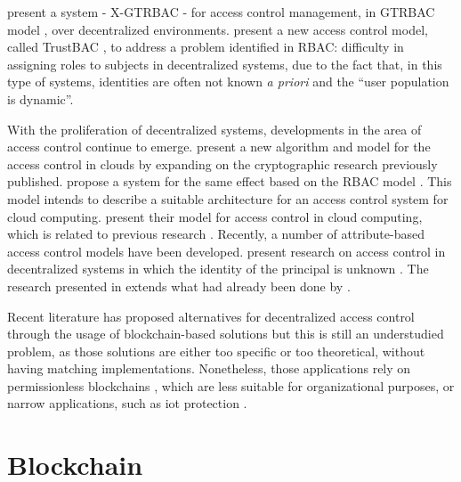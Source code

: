 \citeauthor{bhatti_x-gtrbac_2004} \cite{bhatti_x-gtrbac_2004} present a system - X-GTRBAC - for access control management, in GTRBAC model \cite{joshi_generalized_2005}, over decentralized environments. \citeauthor{chakraborty_trustbac:_2006} \cite{chakraborty_trustbac:_2006} present a new access control model, called TrustBAC \cite{chakraborty_trustbac:_2006}, to address a problem identified in RBAC: difficulty in assigning roles to subjects in decentralized systems, due to the fact that, in this type of systems, identities are often not known \emph{a priori} and the “user population is dynamic”.

With the proliferation of decentralized systems, developments in the area of access control continue
to emerge. \citeauthor{ruj_dacc:_2011} \cite{ruj_dacc:_2011} present a new algorithm and model for the access control \cite{ruj_dacc:_2011} in clouds by expanding on the cryptographic research previously published. \citeauthor{calero_toward_2010} \cite{calero_toward_2010} propose a system for the same effect based on the RBAC model \cite{calero_toward_2010}. This model intends to describe a suitable architecture for an access control system for cloud computing. \citeauthor{yu_achieving_2010} \cite{yu_achieving_2010} present their model for access control in cloud computing, which is related to previous research \cite{calero_toward_2010}. Recently, a number of attribute-based access control models have been developed. \citeauthor{ruj_decentralized_2014} \cite{ruj_decentralized_2014} present research on access control in decentralized systems in which the identity of the principal is unknown \cite{ruj_decentralized_2014}. The research presented in \cite{ruj_decentralized_2014} extends what had already been done by \citeauthor{ruj_privacy_2012} \cite{ruj_privacy_2012}.

Recent literature has proposed alternatives for decentralized access control through the usage of blockchain-based solutions but this is still an understudied problem, as those solutions are either too specific or too theoretical, without having matching implementations. Nonetheless, those applications rely on permissionless blockchains \cite{maesa_blockchain_2017}, which are less suitable for organizational purposes, or narrow applications, such as \gls{iot} protection \cite{ouaddah_fairaccess:_2017}.

\section{Blockchain}
\label{sec:related-blockchain}

